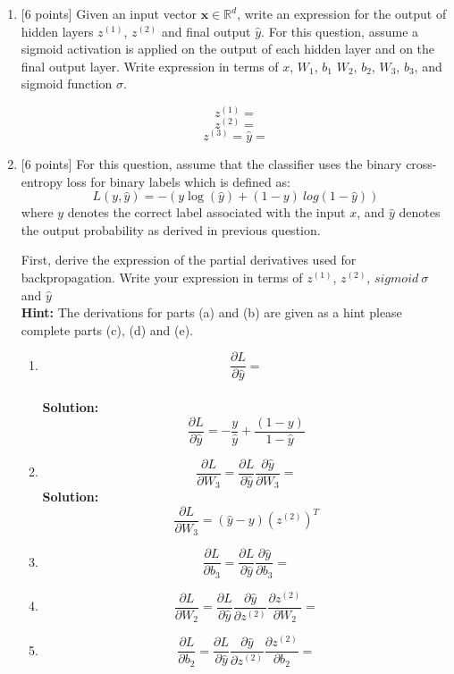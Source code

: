 \documentclass[letterpaper]{article}
\begin{document}
\begin{enumerate}
\item{[6 points]} Given an input vector $\textbf{x} \in \mathbb{R}^{d}$, write an expression for the output of hidden layers $z^{(1)}$, $z^{(2)}$ and final output $\hat{y}$. For this question, assume a sigmoid activation is applied on the output of each hidden layer and on the final output layer. Write expression in terms of $x$, $W_1$, $b_1$ $W_2$, $b_2$, $W_3$, $b_3$, and sigmoid function $\sigma$. 

$$z^{(1)} = $$
$$z^{(2)} = $$
$$z^{(3)} = \hat{y} = $$

\item{[6 points]} For this question, assume that the classifier uses the binary cross-entropy loss for binary labels which is defined as:
 $$L(y,\hat{y}) = -(y \log(\hat{y})+(1-y)\ log(1-\hat{y}))$$
where $y$ denotes the correct label associated with the input $x$, and $\hat{y}$ denotes the output probability as derived in previous question.



First, derive the expression of the partial derivatives used for backpropagation. Write your expression in terms of $z^{(1)}$, $z^{(2)}$, $sigmoid  \ \sigma$ and $\hat{y}$\\
{\bf Hint:} The derivations for parts (a) and (b) are given as a hint please complete parts (c), (d) and (e).
\begin{enumerate}
    \item $$\frac{\partial{L}}{\partial{\hat{y}}} = $$\\
    {\bf Solution:} {\color{blue}  $$\frac{\partial{L}}{\partial{\hat{y}}} = -\frac{y}{\hat{y}} + \frac{(1-y)}{1-\hat{y}}$$}
    \item $$\frac{\partial{L}}{\partial{W_3}} = \frac{\partial{L}}{\partial{\hat{y}}}\frac{\partial{\hat{y}}}{\partial{W_3}} = $$
    {\bf Solution:} {\color{blue} $$\frac{\partial{L}}{\partial{W_3}} = (\hat{y} - y)(z^{(2)})^T$$}
    \item $$\frac{\partial{L}}{\partial{b_3}} = \frac{\partial{L}}{\partial{\hat{y}}}\frac{\partial{\hat{y}}}{\partial{b_3}} = $$
    \item $$\frac{\partial{L}}{\partial{W_2}} =  \frac{\partial{L}}{\partial{\hat{y}}}\frac{\partial{\hat{y}}}{\partial{z^{(2)}}}\frac{\partial{z^{(2)}}}{\partial{W_{2}}} = $$
    \item $$\frac{\partial{L}}{\partial{b_2}} = \frac{\partial{L}}{\partial{\hat{y}}}\frac{\partial{\hat{y}}}{\partial{z^{(2)}}}\frac{\partial{z^{(2)}}}{\partial{b_{2}}} = $$
\end{enumerate}


\end{enumerate}
\end{document}

